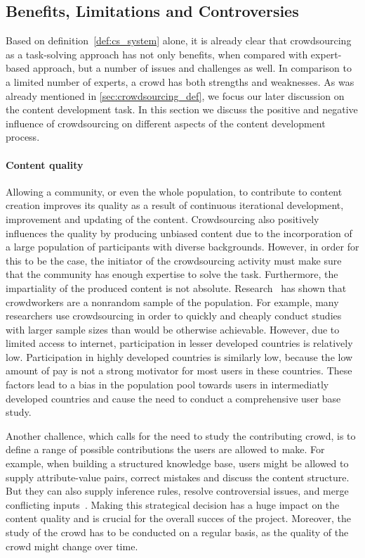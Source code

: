 \documentclass[ngerman,UKenglish,table]{scrbook}
\begin{document}
\subsection{Benefits, Limitations and Controversies}

Based on definition~\autoref{def:cs_system} alone, it is already clear that crowdsourcing as a task-solving approach has not only benefits, when compared with expert-based approach, but a number of issues and challenges as well.
In comparison to a limited number of experts, a crowd has both strengths and weaknesses.
As was already mentioned in \autoref{sec:crowdsourcing_def}, we focus our later discussion on the content development task.
In this section we discuss the positive and negative influence of crowdsourcing on different aspects of the content development process.

\paragraph{Content quality}

Allowing a community, or even the whole population, to contribute to content creation improves its quality as a result of continuous iterational development, improvement and updating of the content.
Crowdsourcing also positively influences the quality by producing unbiased content due to the incorporation of a large population of participants with diverse backgrounds. 
However, in order for this to be the case, the initiator of the crowdsourcing activity must make sure that the community has enough expertise to solve the task.
Furthermore, the impartiality of the produced content is not absolute.
Research~\cite{hirth2011human} has shown that crowdworkers are a nonrandom sample of the population.
For example, many researchers use crowdsourcing in order to quickly and cheaply conduct studies with larger sample sizes than would be otherwise achievable.
However, due to limited access to internet, participation in lesser developed countries is relatively low.
Participation in highly developed countries is similarly low, because the low amount of pay is not a strong motivator for most users in these countries.
These factors lead to a bias in the population pool towards users in intermediatly developed countries and cause the need to conduct a comprehensive user base study.

Another challence, which calls for the need to study the contributing crowd, is to define a range of possible contributions the users are allowed to make. 
For example, when building a structured knowledge base, users might be allowed to supply attribute-value pairs, correct mistakes and discuss the content structure.
But they can also supply inference rules, resolve controversial issues, and merge conflicting inputs~\cite{richardson2003building}.
Making this strategical decision has a huge impact on the content quality and is crucial for the overall succes of the project.
Moreover, the study of the crowd has to be conducted on a regular basis, as the quality of the crowd might change over time.
\end{document}
